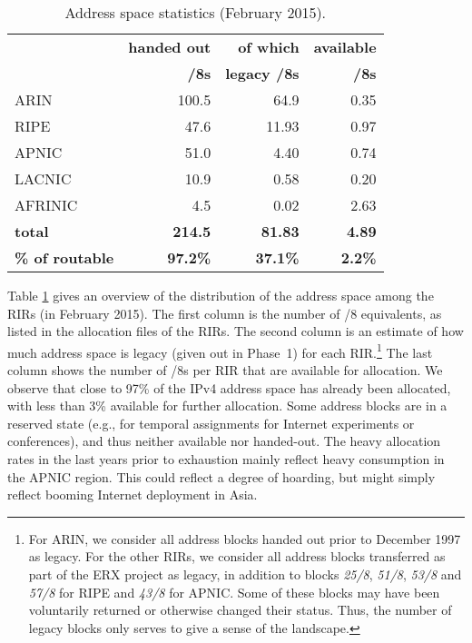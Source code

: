 \documentclass[letter]{sigcomm-alternate}
\begin{document}
\begin{table}
\small
\begin{center}
\begin{tabular}{|l||r|r||r|}
\hline
  & \textbf{handed out} & \textbf{of which} & \textbf{available} \\ 
  & \textbf{/8s} & \textbf{legacy /8s} & \textbf{/8s} \\ 

\hline 
\hline 
ARIN & 100.5 &  64.9 & 0.35 \\ 
\hline 
RIPE & 47.6 &  11.93 & 0.97 \\ 
\hline 
APNIC & 51.0 &  4.40 & 0.74 \\ 
\hline 
LACNIC & 10.9 &  0.58 & 0.20 \\ 
\hline 
AFRINIC & 4.5 &  0.02 & 2.63 \\ 
\hline 
\hline
\textbf{total} & \textbf{214.5} & \textbf{ 81.83} & \textbf{4.89} \\ 
\textbf{\textbf{\% of routable}} & \textbf{97.2\%} &  \textbf{37.1\%} & 
\textbf{2.2\%} \\ 
\hline
\end{tabular} 
\end{center}
\caption{Address space statistics (February 2015).}
\label{tab:allocation_stats}
 \vspace{-1.5em}
\end{table}

Table \ref{tab:allocation_stats} gives an overview of the distribution of the
address space among the RIRs (in February 2015). The first column is the 
number of /8 equivalents, as listed in the allocation files of the RIRs.  The 
second column is an estimate of how much address space is legacy 
(given out in Phase~1) for each RIR.\footnote{
	For ARIN, we consider all address blocks handed out prior to
	December 1997 as legacy.  For the other RIRs, we consider all address
	blocks transferred as part of the ERX project as legacy, in addition to 
	blocks \textit{25/8}, \textit{51/8}, \textit{53/8} and \textit{57/8} for 
	RIPE and \textit{43/8} for APNIC. Some of these blocks may have been 
	voluntarily returned or otherwise changed their status.  Thus, 	the 
	number of legacy blocks only serves to give a sense of the landscape.
}
The last column shows the number of /8s per RIR that are available for
allocation. We observe that close to 97\% of the IPv4 address space has 
already been allocated, with less than 3\% available for further allocation.  
Some address blocks are in a reserved state (e.g., for temporal assignments for 
Internet experiments or conferences), and thus neither available nor 
handed-out. The heavy allocation rates in the last years prior to 
exhaustion mainly reflect heavy consumption in the APNIC region.  This could 
reflect a degree of hoarding, but might simply reflect booming Internet 
deployment in Asia.
\end{document}
